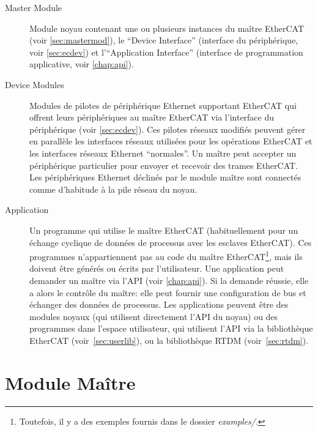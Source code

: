 \documentclass[a4paper,12pt,BCOR=6mm,bibtotoc,idxtotoc]{scrbook}
\begin{document}
\begin{description}

\item[Master Module] Module noyau contenant une
  ou plusieurs instances du ma\^itre EtherCAT (voir
  \autoref{sec:mastermod}), le ``Device Interface'' (interface du
  p\'eriph\'erique, voir \autoref{sec:ecdev}) et l'``Application
  Interface'' (interface de programmation applicative, voir
  \autoref{chap:api}).

\item[Device Modules] Modules de pilotes de p\'eriph\'erique Ethernet supportant EtherCAT
  qui offrent leurs p\'eriph\'eriques au ma\^itre EtherCAT via
  l'interface du p\'eriph\'erique (voir \autoref{sec:ecdev}).  Ces
  pilotes r\'eseaux modifi\'es peuvent g\'erer en parall\`ele les
  interfaces r\'eseaux utilis\'ees pour les op\'erations EtherCAT et
  les interfaces r\'eseaux Ethernet ``normales''.  Un ma\^itre peut
  accepter un p\'eriph\'erique particulier pour envoyer et recevoir
  des trames EtherCAT. Les p\'eriph\'eriques Ethernet d\'eclin\'es
  par le module ma\^itre sont connect\'es comme d'habitude \`a la pile
  r\'eseau du noyau.

\item[Application] Un programme qui utilise le
  ma\^itre EtherCAT (habituellement pour un \'echange cyclique de
  donn\'ees de processus avec les esclaves EtherCAT).  Ces programmes
  n'appartiennent pas au code du ma\^itre EtherCAT\footnote{Toutefois,
  il y a des exemples fournis dans le dossier \textit{examples/}.},
  mais ils doivent \^etre g\'en\'er\'es ou \'ecrits par
  l'utilisateur. Une application peut demander un ma\^itre via l'API
  (voir \autoref{chap:api}). Si la demande r\'eussie, elle a alors le
  contr\^ole du ma\^itre: elle peut fournir une configuration de bus
  et \'echanger des donn\'ees de processus. Les applications peuvent
  \^etre des modules noyaux (qui utilisent directement l'API du noyau)
  ou des programmes dans l'espace utilisateur, qui utilisent l'API via
  la biblioth\`eque EtherCAT (voir~\autoref{sec:userlib}), ou la
  biblioth\`eque RTDM (voir~\autoref{sec:rtdm}).

\end{description}


\section{Module Ma\^itre}
\label{sec:mastermod}
\end{document}
